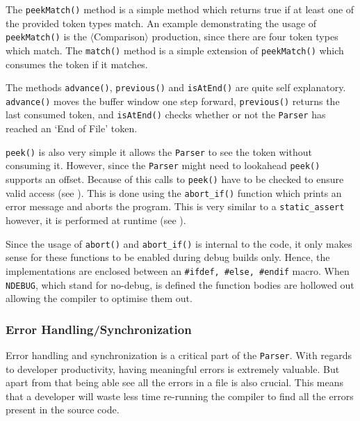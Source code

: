 The \texttt{peekMatch()} method is a simple method which returns
true if at least one of the provided token types match. An
example demonstrating the usage of \texttt{peekMatch()} is the
$\langle$Comparison$\rangle$ production, since there are four
token types which match. The \texttt{match()} method is a simple
extension of \texttt{peekMatch()} which consumes the token if it
matches.

The methods \texttt{advance()}, \texttt{previous()} and
\texttt{isAtEnd()} are quite self explanatory.
\texttt{advance()} moves the buffer window one step forward,
\texttt{previous()} returns the last consumed token, and
\texttt{isAtEnd()} checks whether or not the \texttt{Parser} has
reached an `End of File' token.

\texttt{peek()} is also very simple it allows the
\texttt{Parser} to see the token without consuming it. However,
since the \texttt{Parser} might need to lookahead
\texttt{peek()} supports an offset. Because of this calls to
\texttt{peek()} have to be checked to ensure valid access (see
). This is done using the \texttt{abort\_if()}
function which prints an error message and aborts the program.
This is very similar to a \texttt{static\_assert} however, it is
performed at runtime (see ).





\begin{note}
Since the usage of \texttt{abort()} and \texttt{abort\_if()} is
internal to the code, it only makes sense for these functions to
be enabled during debug builds only. Hence, the implementations
are enclosed between an \texttt{\#ifdef, \#else, \#endif} macro.
When \texttt{NDEBUG}, which stand for no-debug, is defined the
function bodies are hollowed out allowing the \CC{} compiler to
optimise them out.
\end{note}

\subsubsection{Error Handling/Synchronization}

Error handling and synchronization is a critical part of the
\texttt{Parser}. With regards to developer productivity, having
meaningful errors is extremely valuable. But apart from that
being able see all the errors in a file is also crucial. This
means that a developer will waste less time re-running the
compiler to find all the errors present in the source code.


